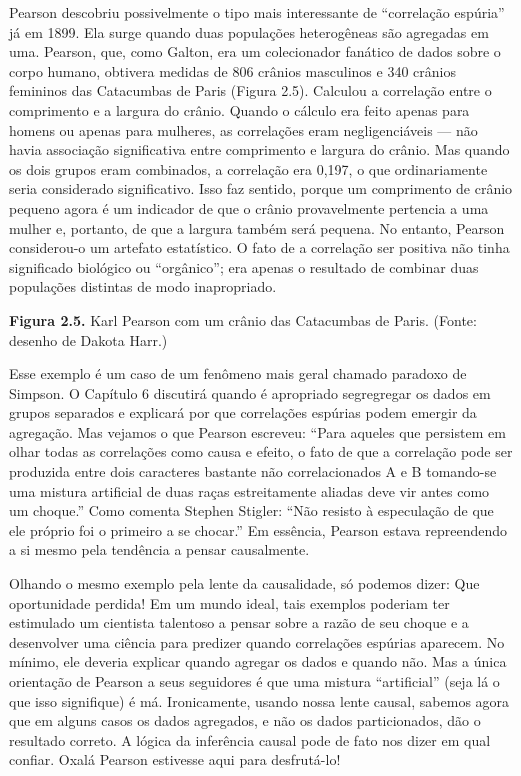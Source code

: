 \documentclass[11pt,a5paper,twoside]{book}
\begin{document}
Pearson descobriu possivelmente o tipo mais interessante de “correlação espúria” já em 1899. Ela surge quando duas populações heterogêneas são agregadas em uma. Pearson, que, como Galton, era um colecionador fanático de dados sobre o corpo humano, obtivera medidas de 806 crânios masculinos e 340 crânios femininos das Catacumbas de Paris (Figura 2.5). Calculou a correlação entre o comprimento e a largura do crânio. Quando o cálculo era feito apenas para homens ou apenas para mulheres, as correlações eram negligenciáveis — não havia associação significativa entre comprimento e largura do crânio. Mas quando os dois grupos eram combinados, a correlação era 0,197, o que ordinariamente seria considerado significativo. Isso faz sentido, porque um comprimento de crânio pequeno agora é um indicador de que o crânio provavelmente pertencia a uma mulher e, portanto, de que a largura também será pequena. No entanto, Pearson considerou-o um artefato estatístico. O fato de a correlação ser positiva não tinha significado biológico ou “orgânico”; era apenas o resultado de combinar duas populações distintas de modo inapropriado.

\textbf{Figura 2.5.} Karl Pearson com um crânio das Catacumbas de Paris. (Fonte: desenho de Dakota Harr.)

Esse exemplo é um caso de um fenômeno mais geral chamado paradoxo de Simpson. O Capítulo 6 discutirá quando é apropriado segregregar os dados em grupos separados e explicará por que correlações espúrias podem emergir da agregação. Mas vejamos o que Pearson escreveu: “Para aqueles que persistem em olhar todas as correlações como causa e efeito, o fato de que a correlação pode ser produzida entre dois caracteres bastante não correlacionados A e B tomando-se uma mistura artificial de duas raças estreitamente aliadas deve vir antes como um choque.” Como comenta Stephen Stigler: “Não resisto à especulação de que ele próprio foi o primeiro a se chocar.” Em essência, Pearson estava repreendendo a si mesmo pela tendência a pensar causalmente.

Olhando o mesmo exemplo pela lente da causalidade, só podemos dizer: Que oportunidade perdida! Em um mundo ideal, tais exemplos poderiam ter estimulado um cientista talentoso a pensar sobre a razão de seu choque e a desenvolver uma ciência para predizer quando correlações espúrias aparecem. No mínimo, ele deveria explicar quando agregar os dados e quando não. Mas a única orientação de Pearson a seus seguidores é que uma mistura “artificial” (seja lá o que isso signifique) é má. Ironicamente, usando nossa lente causal, sabemos agora que em alguns casos os dados agregados, e não os dados particionados, dão o resultado correto. A lógica da inferência causal pode de fato nos dizer em qual confiar. Oxalá Pearson estivesse aqui para desfrutá-lo!
\end{document}

